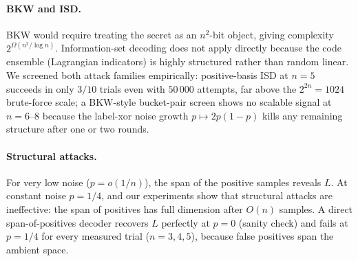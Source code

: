 \documentclass[11pt,a4paper]{article}
\theoremstyle{plain}
\theoremstyle{definition}
\begin{document}
\paragraph{BKW and ISD.}
BKW would require treating the secret as an $n^2$-bit object, giving complexity $2^{\Omega(n^2 / \log n)}$. Information-set decoding does not apply directly because the code ensemble (Lagrangian indicators) is highly structured rather than random linear.  We screened both attack families empirically: positive-basis ISD at $n=5$ succeeds in only $3/10$ trials even with $50\,000$ attempts, far above the $2^{2n}=1024$ brute-force scale; a BKW-style bucket-pair screen shows no scalable signal at $n=6$--$8$ because the label-xor noise growth $p\mapsto2p(1-p)$ kills any remaining structure after one or two rounds.

\paragraph{Structural attacks.}
For very low noise ($p = o(1/n)$), the span of the positive samples reveals $L$. At constant noise $p=1/4$, \cite{LPQR26} and our experiments show that structural attacks are ineffective: the span of positives has full dimension after $O(n)$ samples.  A direct span-of-positives decoder recovers $L$ perfectly at $p=0$ (sanity check) and fails at $p=1/4$ for every measured trial ($n=3,4,5$), because false positives span the ambient space.
\end{document}
